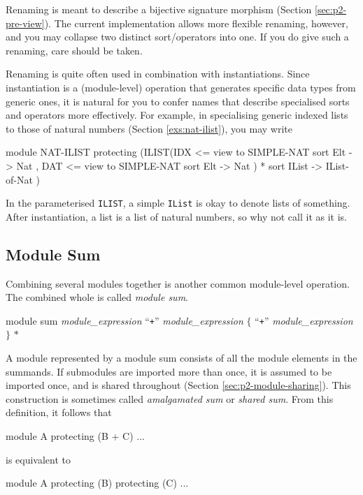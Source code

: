 \documentclass[a4paper]{memoir}
\begin{document}
\begin{warning}
  Renaming is meant to describe a bijective signature
  morphism (Section \ref{sec:p2-pre-view}). The current implementation allows
  more flexible renaming, however, and you may collapse
  two distinct sort/operators into one. If you do give such a renaming,
  care should be taken.
\end{warning}

Renaming is quite often used in combination with instantiations.
Since instantiation is a (module-level) operation that generates
specific data types from generic ones, it is natural for you to
confer names that describe specialised sorts and operators more
effectively. For example, in specialising generic indexed lists to those of
natural numbers (Section \ref{exs:nat-ilist}), you may write
\begin{vvtm}
\begin{ccode}
  module NAT-ILIST {
    protecting (ILIST(IDX <= view to SIMPLE-NAT { sort Elt -> Nat },
                      DAT <= view to SIMPLE-NAT { sort Elt -> Nat })
                  * { sort IList -> IList-of-Nat })
  }
\end{ccode}
\end{vvtm}
In the parameterised \verb|ILIST|, a simple \verb|IList| is okay to
denote lists of something. After instantiation, a list is a list
of natural numbers, so why not call it as it is.

\subsection{Module Sum}

Combining several modules together is another common module-level
operation. The combined whole is called {\em module sum}.

\begin{bsyntax} module sum  \Hline
\textit{module\_expression} ``\texttt{+}'' \textit{module\_expression} $\{$ ``\texttt{+}'' \textit{module\_expression} $\}$ $*$
\end{bsyntax}

A module represented by a module sum consists of all the module elements in
the summands. If submodules are imported more than once, it is assumed to
be imported once, and is shared throughout
(Section \ref{sec:p2-module-sharing}).
This construction is sometimes called {\em amalgamated sum} or
{\em shared sum}.
From this definition, it follows that
\begin{vvtm}
\begin{ccode}
  module A { protecting (B + C) ... }
\end{ccode}
\end{vvtm}
is equivalent to
\begin{vvtm}
\begin{ccode}
  module A { protecting (B) protecting (C) ... }
\end{ccode}
\end{vvtm}
\end{document}
